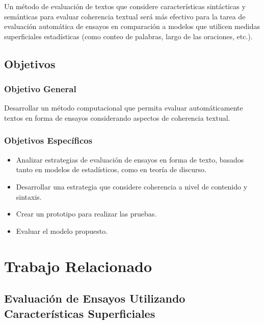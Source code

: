 \documentclass[12pt]{diicc}
\begin{document}
Un método de evaluación de textos que considere características sintácticas y semánticas para evaluar coherencia textual será más efectivo para la tarea de evaluación automática de ensayos en comparación a modelos que utilicen medidas superficiales estadísticas (como conteo de palabras, largo de las oraciones, etc.).

\section{Objetivos}
	\subsection{Objetivo General}
		Desarrollar un método computacional que permita evaluar automáticamente textos en forma de ensayos considerando aspectos de coherencia textual.

	\subsection{Objetivos Específicos}

	\begin{itemize}
		\item Analizar estrategias de evaluación de ensayos en forma de texto, basados tanto en modelos de estadísticos, como en teoría de discurso.
		\item Desarrollar una estrategia que considere coherencia a nivel de contenido y sintaxis.
		\item Crear un prototipo para realizar las pruebas.
		\item Evaluar el modelo propuesto.
	\end{itemize}
	

%
% 
\chapter{Trabajo Relacionado}\label{chap:background}

\section{Evaluación de Ensayos Utilizando Características Superficiales}
\end{document}
